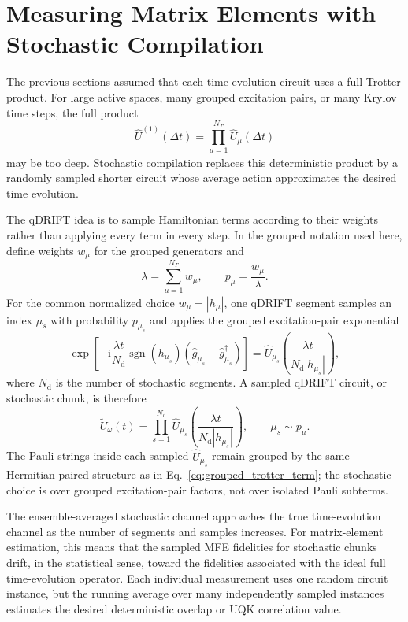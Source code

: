 \documentclass[11pt]{article}
\newcommand{\ii}{\mathrm{i}}
\begin{document}
\section{Measuring Matrix Elements with Stochastic Compilation}

The previous sections assumed that each time-evolution circuit uses a full Trotter product.  For large active spaces, many grouped excitation pairs, or many Krylov time steps, the full product
\begin{equation}
    \hat{U}^{(1)}(\Delta t)=\prod_{\mu=1}^{N_\Gamma}\hat{U}_\mu(\Delta t)
\end{equation}
may be too deep.  Stochastic compilation replaces this deterministic product by a randomly sampled shorter circuit whose average action approximates the desired time evolution.

The qDRIFT idea is to sample Hamiltonian terms according to their weights rather than applying every term in every step.  In the grouped notation used here, define weights $w_\mu$ for the grouped generators and
\begin{equation}
    \lambda=\sum_{\mu=1}^{N_\Gamma}w_\mu,
    \qquad p_\mu=\frac{w_\mu}{\lambda}.
\end{equation}
For the common normalized choice $w_\mu=|h_\mu|$, one qDRIFT segment samples an index $\mu_s$ with probability $p_{\mu_s}$ and applies the grouped excitation-pair exponential
\begin{equation}
    \exp\left[-\ii\frac{\lambda t}{N_{\mathrm{d}}}\operatorname{sgn}(h_{\mu_s})
    \left(\hat{g}_{\mu_s}-\hat{g}_{\mu_s}^\dagger\right)\right]
    = \hat{U}_{\mu_s}\left(\frac{\lambda t}{N_{\mathrm{d}}|h_{\mu_s}|}\right),
\end{equation}
where $N_{\mathrm{d}}$ is the number of stochastic segments.  A sampled qDRIFT circuit, or stochastic chunk, is therefore
\begin{equation}
    \widetilde{U}_\omega(t)
    = \prod_{s=1}^{N_{\mathrm{d}}}
    \hat{U}_{\mu_s}\left(\frac{\lambda t}{N_{\mathrm{d}}|h_{\mu_s}|}\right),
    \qquad \mu_s\sim p_\mu.
\end{equation}
The Pauli strings inside each sampled $\hat{U}_{\mu_s}$ remain grouped by the same Hermitian-paired structure as in Eq.~\eqref{eq:grouped_trotter_term}; the stochastic choice is over grouped excitation-pair factors, not over isolated Pauli subterms.

The ensemble-averaged stochastic channel approaches the true time-evolution channel as the number of segments and samples increases.  For matrix-element estimation, this means that the sampled MFE fidelities for stochastic chunks drift, in the statistical sense, toward the fidelities associated with the ideal full time-evolution operator.  Each individual measurement uses one random circuit instance, but the running average over many independently sampled instances estimates the desired deterministic overlap or UQK correlation value.
\end{document}
